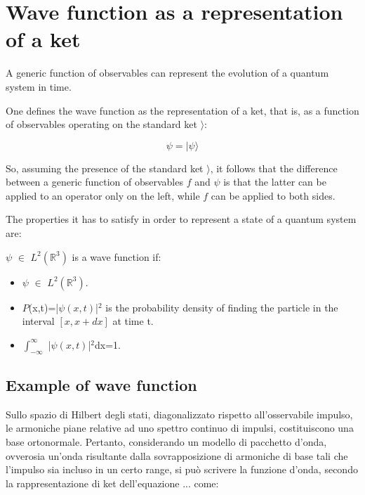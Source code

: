 \documentclass{article}
\begin{document}
\section{Wave function as a representation of a ket}

A generic function of observables can represent the evolution of a quantum system in time.

One defines the wave function as the representation of a ket, that is, as a function of observables operating on the standard ket $\rangle $:

\begin{equation}
  \psi = |\psi\rangle
\end{equation}

So, assuming the presence of the standard ket $\rangle $, it follows that the difference between a generic function of observables $f$ and $\psi$ is that
the latter can be applied to an operator only on the left, while $f$ can be applied to both sides.

The properties it has to satisfy in order to represent a state of a quantum system are:

\begin{tcolorbox}[colframe=gray!90, colback=blue!5, coltitle=white, title=\textbf{Definition: Wave Function}, fonttitle=\large\bfseries]
  $\psi$ $\in$ $L^2(\mathbb{R}^3)$ is a wave function if:
  \begin{itemize}
    \item $\psi$ $\in$ $L^2(\mathbb{R}^3)$.
    \item $P$(x,t)=|$\psi(x,t)$|$^2$ is the probability density of finding the particle in the interval $[x,x+dx]$ at time t.
    \item $\int_{-\infty}^{\infty}$ |$\psi(x,t)$|$^2$dx=1.
  \end{itemize}
\end{tcolorbox}


\subsection{Example of wave function}
Sullo spazio di Hilbert degli stati, diagonalizzato rispetto all'osservabile impulso, le armoniche piane relative ad uno spettro continuo di impulsi, costituiscono una base ortonormale.
Pertanto, considerando un modello di pacchetto d'onda, ovverosia un'onda risultante dalla sovrapposizione di armoniche di base tali che l'impulso sia incluso in
un certo range, si può scrivere la funzione d'onda, secondo la rappresentazione di ket dell'equazione ... come:
\end{document}
